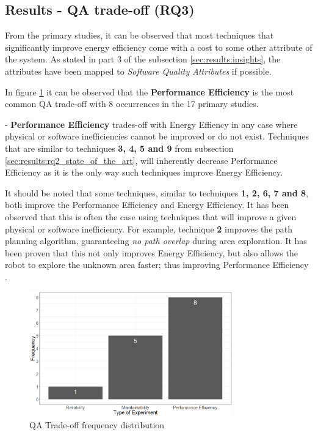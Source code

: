 
\subsection{Results - QA trade-off (RQ3)}
\label{sec:results:rq3_trade_off}
From the primary studies, it can be observed that most techniques that significantly improve energy efficiency come with a cost to some other attribute of the system.
As stated in part 3 of the subsection \ref{sec:results:insights}, the attributes have been mapped to \textit{Software Quality Attributes\cite{iso2011quality_attributes}}
if possible.

In figure \ref{fig:trade_off_freq} it can be observed that the \textbf{Performance Efficiency} is the most common QA trade-off with 8 occurrences in the 17 primary studies.

\vspace{1mm}

- \textbf{Performance Efficiency} trades-off with Energy Effiency in any case where physical or software inefficiencies cannot be improved or do not exist. 
Techniques that are similar to techniques \textbf{3, 4, 5 and 9} from subsection \ref{sec:results:rq2_state_of_the_art}, 
will inherently decrease Performance Efficiency as it is the only way such techniques improve Energy Efficiency.

It should be noted that some techniques, similar to techniques \textbf{1, 2, 6, 7 and 8}, both improve the Performance Efficiency and Energy Efficiency. 
It has been observed that this is often the case using techniques that will improve a given physical or software inefficiency. 
For example, technique \textbf{2} improves the path planning algorithm, guaranteeing \textit{no path overlap} during area exploration. 
It has been proven that this not only improves Energy Efficiency, but also allows the robot to explore the unknown area faster; 
thus improving Performance Efficiency \cite{mei2006mobile_exploration}.

\vspace{1mm}

\begin{figure}[t]
    \includegraphics[width=250pt]{figures/tradeoff_freq_barplot.png}
    \caption{QA Trade-off frequency distribution}
    \label{fig:trade_off_freq}
\end{figure}

